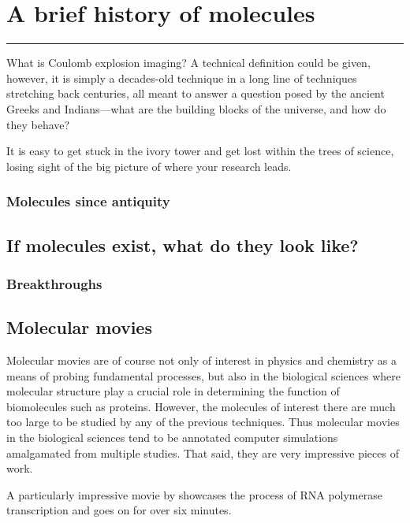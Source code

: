 \chapter{A brief history of molecules}\label{ch:history}

\vspace{-1.5 em}
\minitoc\hrule
\vspace{1.5 em}

What is Coulomb explosion imaging? A technical definition could be given, however, it is simply a decades-old technique in a long line of techniques stretching back centuries, all meant to answer a question posed by the ancient Greeks and Indians---what are the building blocks of the universe, and how do they behave?

It is easy to get stuck in the ivory tower and get lost within the trees of science, losing sight of the big picture of where your research leads.

\subsection{Molecules since antiquity}

\section{If molecules exist, what do they look like?}
\subsection{Breakthroughs}

\section{Molecular movies}
Molecular movies are of course not only of interest in physics and chemistry as a means of probing fundamental processes, but also in the biological sciences where molecular structure play a crucial role in determining the function of biomolecules such as proteins. However, the molecules of interest there are much too large to be studied by any of the previous techniques. Thus molecular movies in the biological sciences tend to be annotated computer simulations amalgamated from multiple studies. That said, they are very impressive pieces of work.

A particularly impressive movie by \citet{Cheung12} showcases the process of RNA polymerase transcription and goes on for over six minutes.

